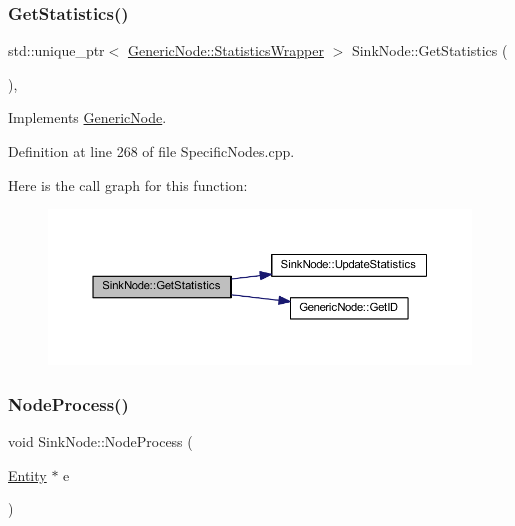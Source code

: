 \subsubsection{\texorpdfstring{Get\+Statistics()}{GetStatistics()}}
{\footnotesize\ttfamily std\+::unique\+\_\+ptr$<$ \hyperlink{class_generic_node_1_1_statistics_wrapper}{Generic\+Node\+::\+Statistics\+Wrapper} $>$ Sink\+Node\+::\+Get\+Statistics (\begin{DoxyParamCaption}{ }\end{DoxyParamCaption})\hspace{0.3cm}{\ttfamily [override]}, {\ttfamily [virtual]}}



Implements \hyperlink{class_generic_node_ae7c8424c8c14fd3de993c902d78deb67}{Generic\+Node}.



Definition at line 268 of file Specific\+Nodes.\+cpp.

Here is the call graph for this function\+:
\nopagebreak
\begin{figure}[H]
\begin{center}
\leavevmode
\includegraphics[width=350pt]{class_sink_node_ad6aeb0857d3ddd9511cd5d24974e1fac_cgraph}
\end{center}
\end{figure}
\mbox{\label{class_sink_node_a5f3fe2c195c3bb154f27bdf3ae27dd27}} 
\subsubsection{\texorpdfstring{Node\+Process()}{NodeProcess()}}
{\footnotesize\ttfamily void Sink\+Node\+::\+Node\+Process (\begin{DoxyParamCaption}\item[{\hyperlink{class_entity}{Entity} $\ast$}]{e }\end{DoxyParamCaption})\hspace{0.3cm}{\ttfamily [virtual]}}



